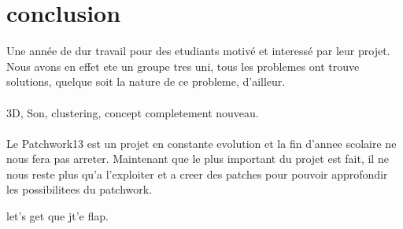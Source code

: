 \chapter{conclusion}

Une ann\'ee de dur travail pour des etudiants motiv\'e et interess\'e par leur projet.
Nous avons en effet ete un groupe tres uni, tous les problemes ont trouve solutions, 
quelque soit la nature de ce probleme, d'ailleur.
\\
\\
3D, Son, clustering, concept completement nouveau.
\\
\\
Le Patchwork13 est un projet en constante evolution et la fin d'annee scolaire ne nous 
fera pas arreter. Maintenant que le plus important du projet est fait, il ne nous reste 
plus qu'a l'exploiter et a creer des patches pour pouvoir approfondir les possibilitees 
du patchwork.
\\
\begin{center}
let's get que jt'e flap.
\end{center}